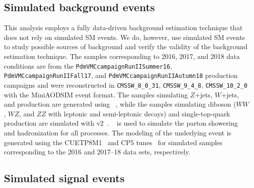 \subsection{Simulated background events}
\label{bg_samples}
This analysis employs a fully data-driven background estimation technique that does not rely on simulated SM events. We do, however, use simulated SM events to study possible sources of background and verify the validity of the background estimation technique. The samples corresponding to 2016, 2017, and 2018 data conditions are from the \texttt{PdmVMCcampaignRunIISummer16}, \texttt{PdmVMCcampaignRunIIFall17}, and \texttt{PdmVMCcampaignRunIIAutumn18} production campaigns and were reconstructed in \texttt{CMSSW\_8\_0\_31}, \texttt{CMSSW\_9\_4\_8}, \texttt{CMSSW\_10\_2\_0} with the MiniAODSIM event format. The samples simulating $Z$+jets, $W$+jets, and \ttbar production are generated using \MGvATNLO~\cite{madgraph,fxfx,mlm}, while the samples simulating diboson ($WW$, $WZ$, and $ZZ$ with leptonic and semi-leptonic decays) and single-top-quark production are simulated with \POWHEG v2~\cite{Frixione:2002ik,Nason:2004rx,Frixione:2007vw,Alioli:2008gx,Alioli:2010xd}. ~\cite{PYTHIA8} is used to simulate the parton showering and hadronization for all processes. The modeling of the underlying event is generated using the CUETP8M1~\cite{Khachatryan:2015pea} and CP5 tunes~\cite{Sirunyan:2019dfx} for simulated samples corresponding to the 2016 and 2017--18 data sets, respectively.

\subsection{Simulated signal events}

